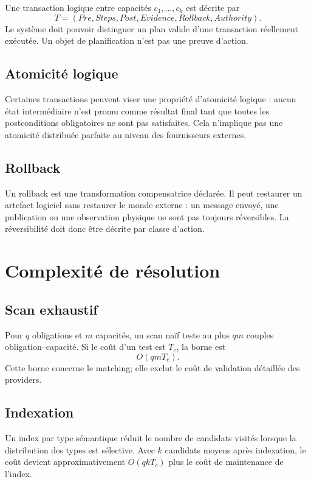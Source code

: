 Une transaction logique entre capacités $c_1,\ldots,c_k$ est décrite par
\[
T=(Pre,Steps,Post,Evidence,Rollback,Authority).
\]
Le système doit pouvoir distinguer un plan valide d'une transaction réellement exécutée. Un objet de planification n'est pas une preuve d'action.

\section{Atomicité logique}

Certaines transactions peuvent viser une propriété d'atomicité logique : aucun état intermédiaire n'est promu comme résultat final tant que toutes les postconditions obligatoires ne sont pas satisfaites. Cela n'implique pas une atomicité distribuée parfaite au niveau des fournisseurs externes.

\section{Rollback}

Un rollback est une transformation compensatrice déclarée. Il peut restaurer un artefact logiciel sans restaurer le monde externe : un message envoyé, une publication ou une observation physique ne sont pas toujours réversibles. La réversibilité doit donc être décrite par classe d'action.

\chapter{Complexité de résolution}

\section{Scan exhaustif}

Pour $q$ obligations et $m$ capacités, un scan naïf teste au plus $qm$ couples obligation--capacité. Si le coût d'un test est $T_c$, la borne est
\[
O(qmT_c).
\]
Cette borne concerne le matching; elle exclut le coût de validation détaillée des providers.

\section{Indexation}

Un index par type sémantique réduit le nombre de candidats visités lorsque la distribution des types est sélective. Avec $k$ candidats moyens après indexation, le coût devient approximativement $O(qkT_c)$ plus le coût de maintenance de l'index.

